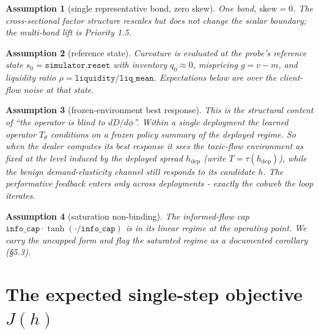 \documentclass[11pt]{article}
\newtheorem{assumption}{Assumption}
\newcommand{\hdep}{h_{\mathrm{dep}}}
\newcommand{\code}[1]{\texttt{#1}}
\begin{document}
\begin{assumption}[single representative bond, zero skew]
One bond, $\mathrm{skew}=0$. The cross-sectional factor structure rescales but
does not change the scalar boundary; the multi-bond lift is Priority 1.5.
\end{assumption}

\begin{assumption}[reference state]
Curvature is evaluated at the probe's reference state $s_0=\code{simulator.reset}$
with inventory $q_0\approx 0$, mispricing $g=v-m$, and liquidity ratio
$\rho=\code{liquidity}/\code{liq\_mean}$. Expectations below are over the
client-flow noise at that state.
\end{assumption}

\begin{assumption}[frozen-environment best response]
This is the structural content of ``the operator is blind to $dD/d\phi$''. Within
a single deployment the learned operator $T_\theta$ conditions on a frozen
policy summary of the deployed regime. So when the dealer computes its best
response it sees the toxic-flow environment as fixed at the level induced by the
deployed spread $\hdep$ (write $T=\tau(\hdep)$), while the benign
demand-elasticity channel still responds to its candidate $h$. The performative
feedback enters only across deployments - exactly the cobweb the loop iterates.
\end{assumption}

\begin{assumption}[saturation non-binding]
The informed-flow cap $\code{info\_cap}\cdot\tanh(\cdot/\code{info\_cap})$ is in
its linear regime at the operating point. We carry the uncapped form and flag
the saturated regime as a documented corollary (\S5.3).
\end{assumption}

\section{The expected single-step objective \texorpdfstring{$J(h)$}{J(h)}}
\end{document}
